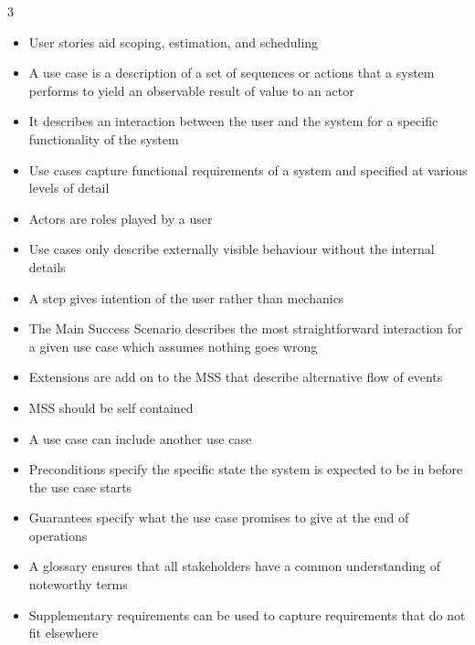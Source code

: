 \documentclass[10pt, landscape]{article}
\begin{document}
\begin{multicols*}{3}
\begin{itemize}
    \item User stories aid scoping, estimation, and scheduling
    \item A use case is a description of a set of sequences or actions that a system performs to yield an observable result of value to an actor
    \item It describes an interaction between the user and the system for a specific functionality of the system
    \item Use cases capture functional requirements of a system and specified at various levels of detail
    \item Actors are roles played by a user
    \item Use cases only describe externally visible behaviour without the internal details
    \item A step gives intention of the user rather than mechanics
    \item The Main Success Scenario describes the most straightforward interaction for a given use case which assumes nothing goes wrong
    \item Extensions are add on to the MSS that describe alternative flow of events
    \item MSS should be self contained
    \item A use case can include another use case
    \item Preconditions specify the specific state the system is expected to be in before the use case starts
    \item Guarantees specify what the use case promises to give at the end of operations
    \item A glossary ensures that all stakeholders have a common understanding of noteworthy terms
    \item Supplementary requirements can be used to capture requirements that do not fit elsewhere
\end{itemize}


\end{multicols*}
\end{document}
